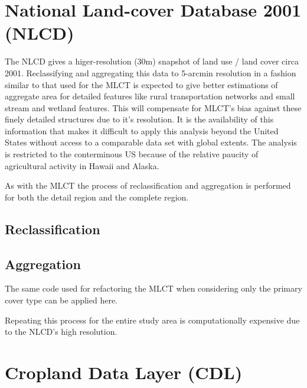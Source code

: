 \section{National Land-cover Database 2001 (NLCD)}
\label{sec:nlcd}

\citet{Homer2004}


The NLCD gives a higer-resolution (30m) snapshot of land use / land
cover circa 2001.    Reclassifying and aggregating this
data to 5-arcmin resolution in a fashion similar to that used for the
MLCT is expected to give better estimations of aggregate area for
detailed features like rural transportation networks and small stream
and wetland features.  This will compensate for MLCT's bias against
these finely detailed structures due to it's resolution.  It is the
availability of this information that makes it difficult to apply this
analysis beyond the United States without access to a comparable data
set with global extents.  The analysis is restricted to the
conterminous US because of the relative paucity of agricultural
activity in Hawaii and Alaska.

As with the MLCT the process of reclassification and aggregation is
performed for both the detail region and the complete region.

\subsection{Reclassification}
\label{sec:nlcd-reclass}



\subsection{Aggregation}
\label{sec:nlcd-aggr}

The same code used for refactoring the MLCT when considering only the
primary cover type can be applied here.

Repeating this process for the entire study area is computationally
expensive due to the NLCD's high resolution.


\section{Cropland Data Layer (CDL)}
\label{sec:cdl}


